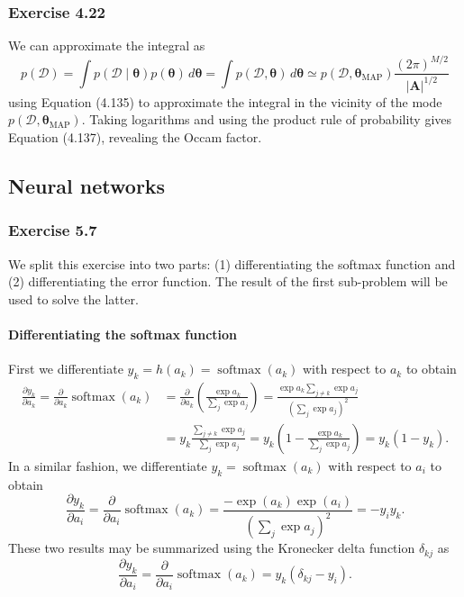 \documentclass[12pt, a4paper]{article}
\newcommand{\D}{\mathcal{D}}
\newcommand{\vect}[1]{\bm{#1}}
\newcommand{\abs}[1]{\left\lvert#1\right\rvert}
\begin{document}
\subsubsection*{Exercise 4.22}
We can approximate the integral as
\begin{equation*}
	p(\D) = \int p( \D \mid \vect{\theta}) p(\vect{\theta}) \, d\vect{\theta}
	= \int p( \D , \vect{\theta}) \, d\vect{\theta}
	\simeq p( \D , \vect{\theta}_{\text{MAP}})  \frac{(2 \pi)^{M/2}}{\abs{\vect{A}}^{1/2}}
\end{equation*}
using Equation (4.135) to approximate the integral in the vicinity of the mode $p( \D , \vect{\theta}_{\text{MAP}})$.
Taking logarithms and using the product rule of probability gives Equation (4.137), revealing the Occam factor.

\subsection{Neural networks}
\subsubsection*{Exercise 5.7}
We split this exercise into two parts: (1) differentiating the softmax function and (2) differentiating the error function.
The result of the first sub-problem will be used to solve the latter.
\paragraph{Differentiating the softmax function}
First we differentiate $y_k = h(a_k) = \operatorname{softmax}(a_k)$ with respect to $a_k$ to obtain
\begin{align*}
\frac{\partial y_k}{\partial a_k}
=
\frac{\partial }{\partial a_k} \operatorname{softmax}(a_k) 
&=
\frac{\partial }{\partial a_k} \left( \frac{\exp a_k}{\sum_j \exp a_j} \right)
=
\frac{\exp a_k \sum_{j \neq k} \exp a_j}{\left( \sum_j \exp a_j \right)^2}
\tag{product rule} \\
&= y_k  \frac{\sum_{j \neq k} \exp a_j}{ \sum_j \exp a_j}
= y_k \left( 1 - \frac{\exp a_k}{\sum_j \exp a_j} \right) = y_k (1 - y_k).
\end{align*}
In a similar fashion, we differentiate $y_k = \operatorname{softmax}(a_k)$ with respect to $a_i$ to obtain
\begin{equation*}
\frac{\partial y_k}{\partial a_i}
=
	\frac{\partial }{\partial a_i}  \operatorname{softmax}(a_k)
	=
	\frac{- \exp(a_k) \exp(a_i)}{\left( \sum_j \exp a_j \right)^2}
	= - y_i y_k.
\end{equation*}
These two results may be summarized using the Kronecker delta function $\delta_{kj}$ as
\begin{equation*}
	\frac{\partial y_k}{\partial a_i}
	=
	\frac{\partial }{\partial a_i}  \operatorname{softmax}(a_k)
	=  y_k \left( \delta_{kj} - y_i \right).
\end{equation*}
\end{document}
